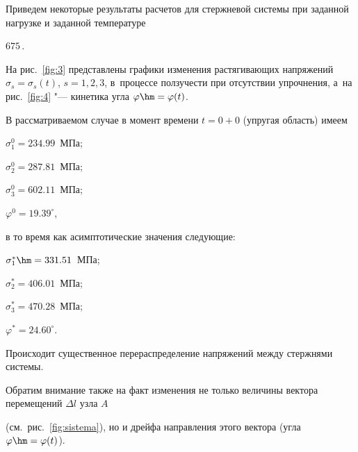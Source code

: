 Приведем некоторые результаты расчетов для стержневой системы при заданной нагрузке и заданной температуре 

$675\,$\textcelsius.

На рис.~\ref{fig:3} представлены графики изменения растягивающих напряжений $\sigma_s = \sigma_s (t)$, $s=1,2,3$, в~процессе ползучести при отсутствии упрочнения, а~на рис.~\ref{fig:4} "--- кинетика угла $\varphi \hm = \varphi (t)$.

В рассматриваемом случае в момент времени $t=0+0$ (упругая область) имеем 

$\sigma_1^{0} = 234.99 $~МПа;

$\sigma_2^{0} = 287.81 $~МПа;

$\sigma_3^{0} = 602.11 $~МПа;

$\varphi^{0} = 19.39^\circ$,

в то время как асимптотические значения следующие:

$\sigma_1^{\ast} \hm = 331.51 $~МПа;

$\sigma_2^{\ast} = 406.01 $~МПа;

$\sigma_3^{\ast} = 470.28 $~МПа;

$\varphi^{\ast} = 24.60^\circ$.

Происходит существенное перераспределение напряжений между стержнями системы.

Обратим внимание также на факт изменения не только величины вектора перемещений $\Delta l$ узла $A$

(см.~рис.~\ref{fig:sistema}), но и дрейфа направления этого вектора (угла $\varphi \hm = \varphi (t)$).





